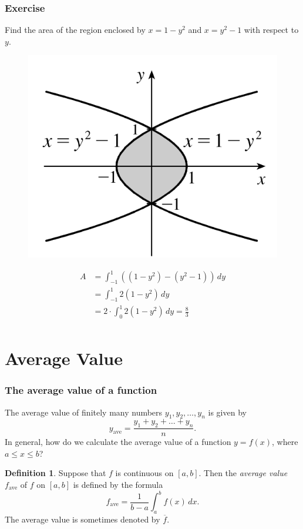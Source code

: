 \documentclass[t]{beamer}
\theoremstyle{plain}
\theoremstyle{definition}
\newtheorem{dfn}{Definition}
\begin{document}
\begin{frame}

\frametitle{Exercise}

Find the area of the region enclosed by $x = 1-y^2$ and $x = y^2 - 1$ with respect to $y$. 

\vspace{-0.5em}
\begin{figure}[t]
\begin{center}
\includegraphics[scale=0.4]{fig/area4}
\end{center}
\end{figure}
\pause
\vspace{-1em}
\begin{align*}
A &= \int_{-1}^{1} ((1-y^2) - (y^2 - 1)) \, dy \\
   &= \int_{-1}^{1} 2(1-y^2) \, dy\\
   &= 2 \cdot \int_{0}^{1} 2(1-y^2) \, dy = \frac{8}{3} \\
\end{align*}

\end{frame}

\section{Average Value}


\begin{frame}
\frametitle{The average value of a function}

\noindent The average value of finitely many numbers $y_1,y_2,\ldots,y_n$ is given by
\[y_{\mathrm{ave}}=\frac{y_1+y_2+\ldots+y_n}{n}.\]
 In general, how do we calculate the average value of a function $y = f(x)$, where $a \leq x \leq b$?
%

\begin{dfn} Suppose that $f$ is continuous on $[a,b]$. Then the \textit{average value} $f_{\mathrm{ave}}$ of $f$ on $[a,b]$ is defined by the formula
\[f_{\textrm{ave}} = \frac{1}{b-a}\int_{a}^{b}f(x)\, dx.\]
The average value is sometimes denoted by $\overline{f}$.\end{dfn}

\end{frame}
\end{document}
